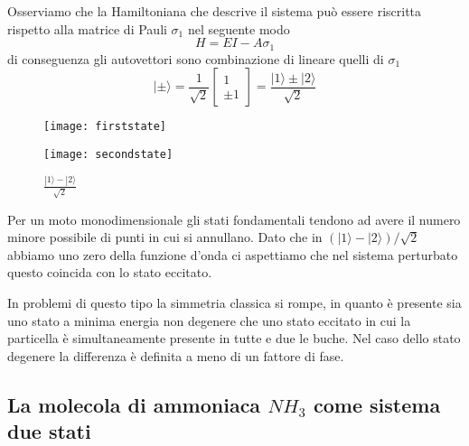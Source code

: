 Osserviamo che la Hamiltoniana che descrive il sistema pu\`o essere riscritta rispetto alla matrice di Pauli $\sigma_1$ nel seguente modo
\begin{equation*}
	H = EI - A \sigma_1
\end{equation*}
di conseguenza gli autovettori sono combinazione di lineare quelli di $\sigma_1$
\begin{equation*}
	|\pm \rangle = \frac{1}{\sqrt{2}}\left [\begin{array}{c}
		1 \\ \pm 1
	\end{array} \right ]  = \frac{|1 \rangle \pm |2\rangle }{\sqrt{2}}
\end{equation*}
\newpage 
\begin{figure}[ht]
    \begin{minipage}[b]{0.45\linewidth}
        \centering
        \texttt{[image: firststate]}
        \caption{$\frac{|1\rangle + |2\rangle }{\sqrt{2}}$}
    \end{minipage}
    \hspace{0.1\linewidth}
    \begin{minipage}[b]{0.45\linewidth}
        \centering
        \texttt{[image: secondstate]}
        \caption{$\frac{|1\rangle - |2\rangle }{\sqrt{2}}$}
    \end{minipage}
\end{figure}
Per un moto monodimensionale gli stati fondamentali tendono ad avere il numero minore possibile di punti in cui si annullano. Dato che in $(|1 \rangle - |2 \rangle)/\sqrt{2}$ abbiamo uno zero della funzione d'onda ci aspettiamo che nel sistema perturbato questo coincida con lo stato eccitato.

In problemi di questo tipo la simmetria classica si rompe, in quanto \`e presente sia uno stato a minima energia non degenere che uno stato eccitato in cui la particella \`e simultaneamente  presente in tutte e due le buche. Nel caso dello stato degenere la differenza \`e definita a meno di un fattore di fase.

\subsection{La molecola di ammoniaca $NH_3$ come sistema due stati}





  


